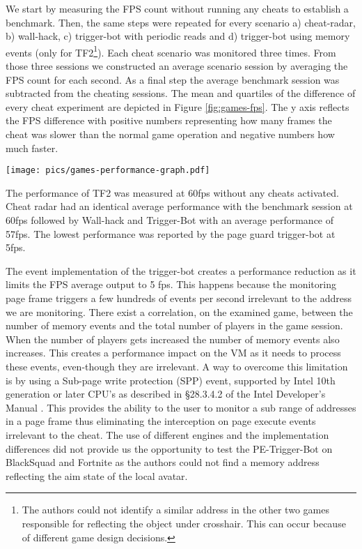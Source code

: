 We start by measuring the FPS count without running any cheats to establish a benchmark. Then, the same steps were repeated for every scenario a) cheat-radar, b) wall-hack, c) trigger-bot with periodic reads and d) trigger-bot using memory events (only for TF2\footnote{The authors could not identify a similar address in the other two games responsible for reflecting the object under crosshair. This can occur because of different game design decisions.}). Each cheat scenario was monitored three times. From those three sessions we constructed an average scenario session by averaging the FPS count for each second. As a final step the average benchmark session was subtracted from the cheating sessions. The mean and quartiles of the difference of every cheat experiment are depicted in Figure \ref{fig:games-fps}. The y axis reflects the FPS difference with positive numbers representing how many frames the cheat was slower than the normal game operation and negative numbers how much faster. 

\begin{figure*}
    \centering
    \texttt{[image: pics/games-performance-graph.pdf]}
    \caption{Mean value of FPS difference and quartiles of game sessions under different cheat scenarios.}
    \label{fig:games-fps}
\end{figure*}

The performance of TF2 was measured at 60fps without any cheats activated. Cheat radar had an identical average performance with the benchmark session at 60fps followed by Wall-hack and Trigger-Bot with an average performance of 57fps. The lowest performance was reported by the page guard trigger-bot at 5fps.

The event implementation of the trigger-bot creates a performance reduction as it limits the FPS average output to 5 fps. This happens because the monitoring page frame triggers a few hundreds of events per second irrelevant to the address we are monitoring. There exist a correlation, on the examined game, between the number of memory events and the total number of players in the game session. When the number of players gets increased the number of memory events also increases. This creates a performance impact on the VM as it needs to process these events, even-though they are irrelevant. A way to overcome this limitation is by using a Sub-page write protection (SPP) event, supported by Intel 10th generation or later CPU's as described in \S28.3.4.2 of the Intel Developer's Manual \cite{IntelSPP}. This provides the ability to the user to monitor a sub range of addresses in a page frame thus eliminating the interception on page execute events irrelevant to the cheat. The use of different engines and the implementation differences did not provide us the opportunity to test the PE-Trigger-Bot on BlackSquad and Fortnite as the authors could not find a memory address reflecting the aim state of the local avatar.


